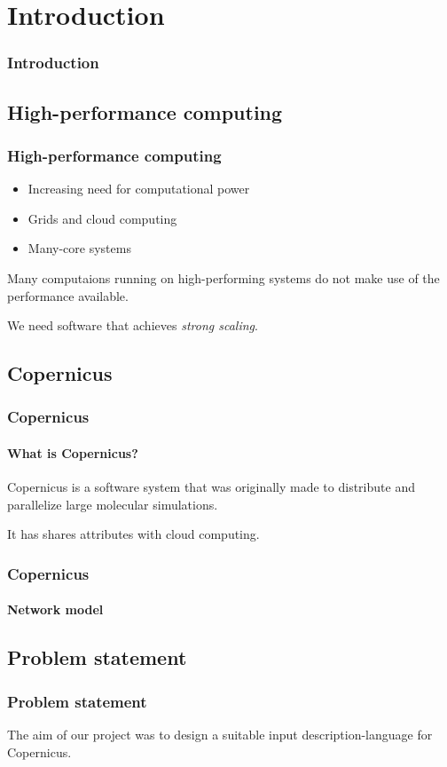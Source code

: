 \section{Introduction}
\begin{frame}
\frametitle{Introduction}
\end{frame}

\subsection*{High-performance computing}
\begin{frame}
\frametitle{High-performance computing}

\begin{itemize}
\pause
\item Increasing need for computational power
\pause
\item Grids and cloud computing
\pause
\item Many-core systems
\end{itemize}
\vspace{10pt}

\pause
Many computaions running on high-performing systems do not make use of
the performance available.
\vspace{10pt}

\pause
We need software that achieves \emph{strong scaling}.

\end{frame}


\subsection*{Copernicus}
\begin{frame}
\frametitle{Copernicus}
\framesubtitle{What is Copernicus?}

Copernicus is a software system that was originally made to distribute
and parallelize large molecular simulations.
\vspace{10pt}

It has shares attributes with cloud computing.
\end{frame}


\begin{frame}
\frametitle{Copernicus}
\framesubtitle{Network model}

\end{frame}


\subsection*{Problem statement}
\begin{frame}
\frametitle{Problem statement}

The aim of our project was to design a suitable input
description-language for Copernicus.

\end{frame}
